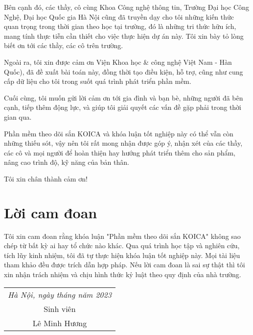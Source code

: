 \documentclass[12pt]{extreport}
\begin{document}
Bên cạnh đó, các thầy, cô cùng Khoa Công nghệ thông tin, Trường Đại học Công Nghệ, Đại học Quốc gia Hà Nội cũng đã truyền dạy cho tôi những kiến thức quan trọng trong thời gian theo học tại trường, đó là những tri thức hữu ích, mang tính thực tiễn cần thiết cho việc thực hiện dự án này. Tôi xin bày tỏ lòng biết ơn tới các thầy, các cô trên trường.

Ngoài ra, tôi xin được cảm ơn Viện Khoa học \& công nghệ Việt Nam - Hàn Quốc), đã đề xuất bài toán này, đồng thời tạo điều kiện, hỗ trợ, cũng như cung cấp dữ liệu cho tôi trong suốt quá trình phát triển phần mềm.

Cuối cùng, tôi muốn gửi lời cảm ơn tới gia đình và bạn bè, những người đã bên cạnh, tiếp thêm động lực, và giúp tôi giải quyết các vấn đề gặp phải trong thời gian qua.

Phần mềm theo dõi sắn KOICA và khóa luận tốt nghiệp này có thể vẫn còn những thiếu sót, vậy nên tôi rất mong nhận được góp ý, nhận xét của các thầy, các cô và mọi người để hoàn thiện hay hướng phát triển thêm cho sản phẩm, nâng cao trình độ, kỹ năng của bản thân.

Tôi xin chân thành cảm ơn!

\chapter*{Lời cam đoan}
Tôi xin cam đoan rằng khóa luận "Phần mềm theo dõi sắn KOICA" không sao chép từ bất kỳ ai hay tổ chức nào khác. Qua quá trình học tập và nghiên cứu, tích lũy kinh nhiệm, tôi đã tự thực hiện khóa luận tốt nghiệp này. Mọi tài liệu tham khảo đều được trích dẫn hợp pháp. Nếu lời cam đoan là sai sự thật thì tôi xin nhận trách nhiệm và chịu hình thức kỷ luật theo quy định của nhà trường.

\vspace{1cm}

\hfill
\begin{tabular}{c@{}}
\textit{Hà Nội, ngày \; tháng \; năm 2023}
\vspace{3cm}\\
Sinh viên \\
Lê Minh Hương \\
\end{tabular}


\clearpage{}


\tableofcontents{}
\clearpage{}

\listoffigures{}
\clearpage{}
\end{document}
